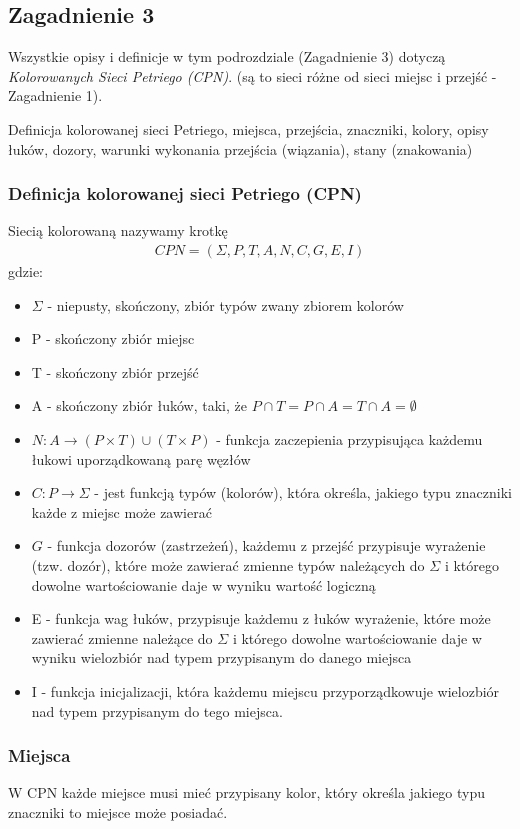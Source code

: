 \documentclass[a4paper,15pt]{article}
\newcommand{\definition}[2]{
    \begin{tcolorbox}[colback=green!5!white,colframe=mGreen,title={Definicja -  #1}]
        #2
    \end{tcolorbox}
}
\newcommand{\question}[2]{
    \begin{tcolorbox}[colback=black!5!white,colframe=black,title={Zagadnienie #1}]
        #2
    \end{tcolorbox}
}
\begin{document}
\newpage
\subsection{Zagadnienie 3}
Wszystkie opisy i definicje w tym podrozdziale (Zagadnienie 3) dotyczą \textit{Kolorowanych Sieci Petriego (CPN)}. (są to sieci różne od sieci miejsc i przejść - Zagadnienie 1).
\question{3}{
Definicja kolorowanej sieci Petriego, miejsca, przejścia, znaczniki,
kolory, opisy łuków, dozory, warunki wykonania przejścia (wiązania),
stany (znakowania)
}

\subsubsection{Definicja kolorowanej sieci Petriego (CPN)}
\definition{Sieć kolorowana}{
Siecią kolorowaną nazywamy krotkę 
\begin{align*}
CPN = (\Sigma , P, T, A, N, C, G, E, I)
\end{align*}
gdzie:
\begin{itemize}
\item $\Sigma$ - niepusty, skończony, zbiór typów zwany zbiorem kolorów
\item P - skończony zbiór miejsc
\item T - skończony zbiór przejść
\item A - skończony zbiór łuków, taki, że $P \cap T = P \cap A = T \cap A = \emptyset$
\item $N: A \rightarrow (P\times T)\cup (T \times P)$ - funkcja zaczepienia przypisująca każdemu łukowi uporządkowaną parę węzłów
\item $C: P \rightarrow \Sigma $ - jest funkcją typów (kolorów), która określa, jakiego typu znaczniki każde z miejsc może zawierać
\item $G$ - funkcja dozorów (zastrzeżeń), każdemu z przejść przypisuje wyrażenie (tzw. dozór), które może zawierać zmienne typów należących do $\Sigma$ i którego dowolne wartościowanie daje w wyniku wartość logiczną
\item E - funkcja wag łuków, przypisuje każdemu z łuków wyrażenie, które może zawierać zmienne należące do $\Sigma$ i którego dowolne wartościowanie daje w wyniku wielozbiór nad typem przypisanym do danego miejsca
\item I - funkcja inicjalizacji, która każdemu miejscu przyporządkowuje wielozbiór nad typem przypisanym do tego miejsca.
\end{itemize}
}

\subsubsection{Miejsca}
W CPN każde miejsce musi mieć przypisany kolor, który określa jakiego typu znaczniki to miejsce może posiadać. 
\end{document}

